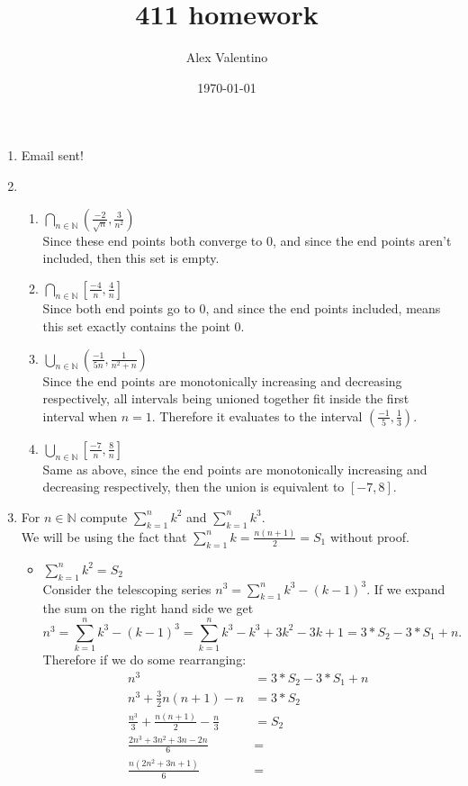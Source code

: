 \documentclass[12pt, letterpaper]{article}
\date{\today}
\author{Alex Valentino}
\title{411 homework}
\newcommand{\N}{\mathbb{N}}
\begin{document}
\begin{enumerate}
	\item Email sent!
	\item 
	\begin{enumerate}
	
	
		\item $\bigcap_{n \in \N} (\frac{-2}{\sqrt{n}}, \frac{3}{n^2})$\\
	Since these end points both converge to 0, and since the end points aren't included, then this set is empty.
		\item $\bigcap_{n \in \N} [\frac{-4}{n},\frac{4}{n}]$\\
		Since both end points go to 0, and since the end points included, means this set exactly contains the point 0.
		\item $\bigcup_{n \in \N} (\frac{-1}{5n}, \frac{1}{n^2+n})$\\
		Since the end points are monotonically increasing and decreasing respectively, all intervals being unioned together fit inside the first interval when $n=1$.  Therefore it evaluates to the interval $(\frac{-1}{5},\frac{1}{3})$.
		\item $\bigcup_{n \in \N} [\frac{-7}{n}, \frac{8}{n}]$\\
		Same as above, since the end points are monotonically increasing and decreasing respectively, then the union is equivalent to $[-7,8]$.   	
	\end{enumerate}
	\item For $n \in \N$ compute $\sum_{k=1}^n k^2$ and $\sum_{k=1}^n k^3$.\\
	We will be using the fact that $\sum_{k=1}^n k = \frac{n(n+1)}{2} = S_1$ 
	without proof.  
	\begin{itemize}
		\item $\sum_{k=1}^n k^2 = S_2$\\
		Consider the telescoping series $n^3 = \sum_{k=1}^n k^3 - (k-1)^3$.
		If we expand the sum on the right hand side we get
		$$
		n^3 = \sum_{k=1}^n k^3 - (k-1)^3 = \sum_{k=1}^n k^3 - k^3 +3k^2 - 3k + 1
		= 3*S_2 - 3*S_1 + n.  
		$$
		Therefore if we do some rearranging:
		\begin{align*}
			n^3 &=3*S_2 - 3*S_1 + n\\
			n^3 + \frac{3}{2}n(n+1) -n &= 3*S_2\\
			\frac{n^3}{3} + \frac{n(n+1)}{2} - \frac{n}{3}  &= S_2\\
			\frac{2n^3 + 3n^2 + 3n-2n}{6}&= \\
			\frac{n(2n^2 + 3n + 1)}{6}&=\\

\end{align*}
\end{itemize}
\end{enumerate}
\end{document}

